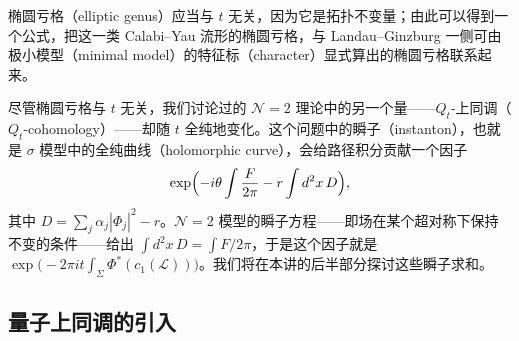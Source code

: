 

椭圆亏格（elliptic genus）应当与 $t$ 无关，因为它是拓扑不变量；由此可以得到一个公式，把这一类 Calabi--Yau 流形的椭圆亏格，与 Landau--Ginzburg 一侧可由极小模型（minimal model）的特征标（character）显式算出的椭圆亏格联系起来。

尽管椭圆亏格与 $t$ 无关，我们讨论过的 $\mathcal{N}=2$ 理论中的另一个量——$Q_t$-上同调（$Q_t$-cohomology）——却随 $t$ 全纯地变化。这个问题中的瞬子（instanton），也就是 $\sigma$ 模型中的全纯曲线（holomorphic curve），会给路径积分贡献一个因子
\[
  \exp\Bigl(-i\theta\int\frac{F}{2\pi}-r\int d^2x\,D\Bigr),
\]
其中 $D=\sum_j\alpha_j|\Phi_j|^2-r$。$\mathcal{N}=2$ 模型的瞬子方程——即场在某个超对称下保持不变的条件——给出 $\int d^2x\,D=\int F/2\pi$，于是这个因子就是 $\exp\bigl(-2\pi it\int_\Sigma\Phi^*(c_1(\mathcal{L}))\bigr)$。我们将在本讲的后半部分探讨这些瞬子求和。


\subsection{量子上同调的引入}

